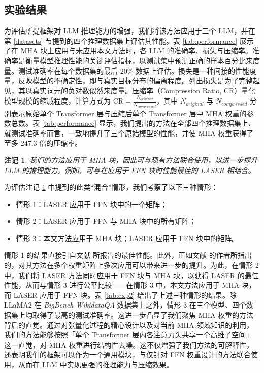 \documentclass[conference]{IEEEtran}
\newtheorem{rem}{\bf{注记}}
\begin{document}
\subsection{实验结果}
为评估所提框架对 LLM 推理能力的增强，我们将该方法应用于三个 LLM，并在第 \ref{datasets} 节提到的四个推理数据集上评估其性能。表 \ref{tab:performance} 展示了在 MHA 块上应用与未应用本文方法时，各 LLM 的准确率、损失与压缩率。准确率是衡量模型推理性能的关键评估指标，以测试集中预测正确的样本百分比来度量。测试准确率在每个数据集的最后 20\% 数据上评估。损失是一种间接的性能度量，反映模型的不确定性，即与真实目标分布的偏离程度。列出损失是为了完整起见，其以真实词元的负对数似然来度量。压缩率（Compression Ratio, CR）量化模型规模的缩减程度，计算方式为 $\text{CR}= \frac{N_{original}}{N_{compressed}}$，其中 $N_{original}$ 与 $N_{compressed}$ 分别表示原始单个 Transformer 层与压缩后单个 Transformer 层中 MHA 权重的参数总数。表 \ref{tab:performance} 显示，我们提出的方法在全部四个推理数据集上、就测试准确率而言，一致地提升了三个原始模型的性能，并使 MHA 权重获得了至多 $247.3$ 倍的压缩率。\par 

\begin{rem}
我们的方法应用于 MHA 块，因此可与现有方法联合使用，以进一步提升 LLM 的推理能力。例如，可与在应用于 FFN 块时性能最佳的 LASER \cite{sharma2023truth} 相结合。
\label{rem:hypbrid}
\end{rem}

为评估注记 \ref{rem:hypbrid} 中提到的此类``混合''情形，我们考察了以下三种情形：
\begin{itemize}
    \item 情形 1：LASER \cite{sharma2023truth} 应用于 FFN 块中的一个矩阵；
    \item 情形 2：LASER \cite{sharma2023truth} 应用于 FFN 与 MHA 块中的所有矩阵；
    \item 情形 3：本文方法应用于 MHA 块；LASER \cite{sharma2023truth} 应用于 FFN 块中的矩阵。
\end{itemize}
情形 1 的结果直接引自文献 \cite{sharma2023truth} 所报告的最佳性能。此外，正如文献 \cite{sharma2023truth} 的作者所指出的，对其方法在多个权重矩阵上多次应用可以带来进一步的提升。为此，在情形 2 中，我们将 LASER 方法同时应用于 FFN 块与 MHA 块，以获得 LASER 的最佳性能，从而与情形 3 进行公平比较——在情形 3 中，本文方法应用于 MHA 块，而 LASER 应用于 FFN 块。表 \ref{tab:exp2} 给出了上述三种情形的结果。除 LLaMA2 在 \textit{BigBench-WikidataQA} 数据集上之外，情形 3 在三个模型、四个数据集上均取得了最高的测试准确率。这进一步凸显了我们聚焦 MHA 权重的方法背后的直觉。通过对张量化过程的精心设计以及对当前 MHA 领域知识的利用，我们的方法能够按照「单个 Transformer 层内各注意力头共享一个高维子空间」这一直觉，对 MHA 权重进行结构性去噪。这不仅增强了我们方法的可解释性，还表明我们的框架可以作为一个通用模块，与仅针对 FFN 权重设计的方法联合使用，从而在 LLM 中实现更强的推理能力与压缩效果。
\end{document}
